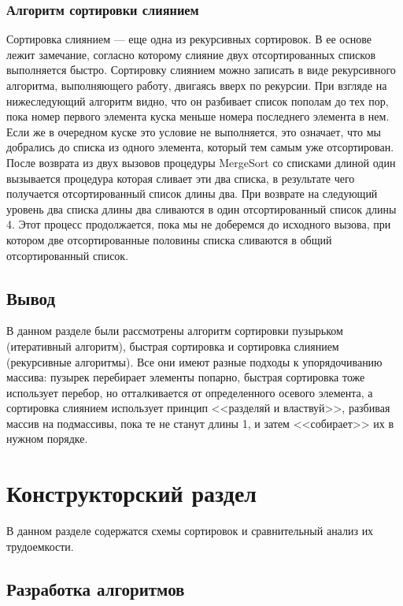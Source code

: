 \documentclass[a4paper,12pt]{article}
\begin{document}
	  	\subsubsection{Алгоритм сортировки слиянием}
		Сортировка слиянием — еще одна из рекурсивных
сортировок. В ее основе лежит замечание, согласно которому слияние
двух отсортированных списков выполняется быстро. Сортировку слиянием можно записать в виде рекурсивного алгоритма, выполняющего работу, двигаясь вверх по рекурсии. При взгляде на нижеследующий алгоритм видно, что он разбивает список
пополам до тех пор, пока номер первого элемента куска меньше номера последнего элемента в нем. Если же в очередном куске это условие
не выполняется, это означает, что мы добрались до списка из одного элемента, который тем самым уже отсортирован. После возврата из
двух вызовов процедуры MergeSort со списками длиной один вызывается процедура  которая сливает эти два списка, в результате
чего получается отсортированный список длины два. При возврате на
следующий уровень два списка длины два сливаются в один отсортированный список длины 4. Этот процесс продолжается, пока мы не
доберемся до исходного вызова, при котором две отсортированные половины списка сливаются в общий отсортированный список.
	

	    
		\subsection*{Вывод}
		В данном разделе были рассмотрены алгоритм сортировки пузырьком (итеративный алгоритм), быстрая сортировка и сортировка слиянием (рекурсивные алгоритмы). Все они имеют разные подходы к упорядочиванию массива: пузырек перебирает элементы попарно, быстрая сортировка тоже использует перебор, но отталкивается от определенного осевого элемента, а сортировка слиянием использует принцип <<разделяй и властвуй>>, разбивая массив на подмассивы, пока те не станут длины 1, и затем <<собирает>> их в нужном порядке. 


\pagebreak


\section{Конструкторский раздел}
	В данном разделе содержатся схемы сортировок и сравнительный анализ их трудоемкости.
	
    
    \subsection{Разработка алгоритмов}
    
\end{document}
